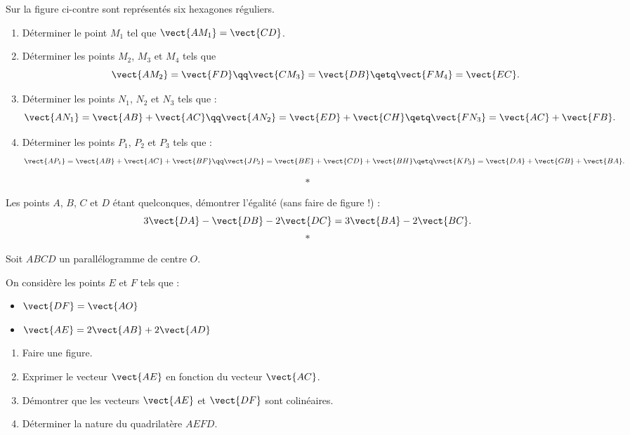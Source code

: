 \documentclass[11pt,openright,twoside,french]{book}
\begin{document}

\exo 

\begin{minipage}{0.7\linewidth}
	Sur la figure ci-contre sont représentés six hexagones réguliers.
	\begin{enumerate}
		\item Déterminer le point $M_1$ tel que $\vect{AM_1} = \vect{CD}$.
		\item Déterminer les points $M_2$, $M_3$ et $M_4$ tels que
		\[\vect{AM_2} = \vect{FD} \qq \vect{CM_3} = \vect{DB} \qetq \vect{FM_4} = \vect{EC}.\]
		\item Déterminer les points $N_1$, $N_2$ et $N_3$ tels que :
		\[\vect{AN_1} = \vect{AB} + \vect{AC} \qq \vect{AN_2} = \vect{ED} + \vect{CH} \qetq \vect{FN_3} = \vect{AC} + \vect{FB}.\]
		\item Déterminer les points $P_1$, $P_2$ et $P_3$ tels que :
		\[\vect{AP_1} = \vect{AB} + \vect{AC} + \vect{BF} \qq \vect{JP_2} = \vect{BE} + \vect{CD} + \vect{BH} \qetq \vect{KP_3} = \vect{DA} + \vect{GB} + \vect{BA}.\]
	\end{enumerate}
\end{minipage}
\begin{minipage}{0.3\linewidth}
\begin{center}
\end{center}
\end{minipage}
\[*\]

\exo Les points $A$, $B$, $C$ et $D$ étant quelconques, démontrer l'égalité (sans faire de figure !) :
\[3\vect{DA} - \vect{DB} - 2\vect{DC} = 3\vect{BA} - 2\vect{BC}.\]
\[*\]

\exo Soit $ABCD$ un parallélogramme de centre $O$.\par
On considère les points $E$ et $F$ tels que :
\begin{itemize}
	\item $\vect{DF} = \vect{AO}$
	\item $\vect{AE} = 2\vect{AB} + 2\vect{AD}$
\end{itemize}

\begin{enumerate}
	\item Faire une figure.
	\item Exprimer le vecteur $\vect{AE}$ en fonction du vecteur $\vect{AC}$.
	\item Démontrer que les vecteurs $\vect{AE}$ et $\vect{DF}$ sont colinéaires.
	\item Déterminer la nature du quadrilatère $AEFD$.
\end{enumerate}
\end{document}

